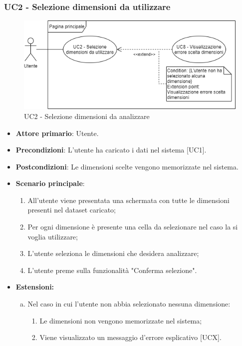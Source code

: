 \subsubsection{UC2 - Selezione dimensioni da utilizzare}
\begin{figure}[h]
\includegraphics[width=\linewidth]{section/Images/UC2.png}
\centering
\caption{UC2 - Selezione dimensioni da analizzare}
\end{figure}
\begin{itemize}
	\item \textbf{Attore primario}: Utente.
	\item \textbf{Precondizioni}: L'utente ha caricato i dati nel sistema [UC1].
	\item \textbf{Postcondizioni}: Le dimensioni scelte vengono memorizzate nel sistema.
	\item \textbf{Scenario principale}:
		\begin{enumerate}
			\item All'utente viene presentata una schermata con tutte le dimensioni presenti nel dataset caricato;
			\item Per ogni dimensione è presente una cella da selezionare nel caso la si voglia utilizzare;
			\item L'utente seleziona le dimensioni che desidera analizzare;
			\item L'utente preme sulla funzionalità "Conferma selezione".
		\end{enumerate}
	\item \textbf{Estensioni:}
		\begin{enumerate}[(a)]
			\item Nel caso in cui l'utente non abbia selezionato nessuna dimensione:
			\begin{enumerate}[1.]
				\item Le dimensioni non vengono memorizzate nel sistema;
				\item Viene visualizzato un messaggio d'errore esplicativo [UCX].
			\end{enumerate}
		\end{enumerate}
\end{itemize}